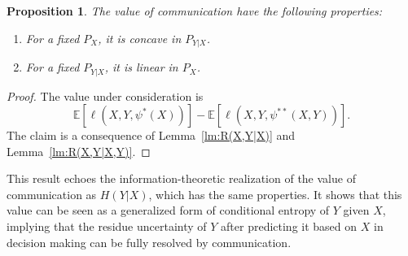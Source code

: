 \documentclass{article}
\newtheorem{proposition}{Proposition}
\newcommand{\E}{\mathbb{E}}
\begin{document}
\begin{proposition}\label{prop:vo_commun}
    The value of communication have the following properties:
\begin{enumerate}[leftmargin=*]%
    \item 
    For a fixed $P_{X}$, it is concave in $P_{Y|X}$.
    \item 
    For a fixed $P_{Y|X}$, it is linear in $P_X$.
\end{enumerate}
\end{proposition}
\begin{proof}
The value under consideration is $$\E[\ell(X,Y,\psi^*(X))] - \E[\ell(X,Y,\psi^{**}(X,Y))].$$ The claim is a consequence of Lemma~\ref{lm:R(X,Y|X)} and Lemma~\ref{lm:R(X,Y|X,Y)}.
\end{proof}
This result echoes the information-theoretic realization of the value of communication as $H(Y|X)$, which has the same properties. It shows that this value can be seen as a generalized form of conditional entropy of $Y$ given $X$, implying that the residue uncertainty of $Y$ after predicting it based on $X$ in decision making can be fully resolved by communication.
\end{document}
